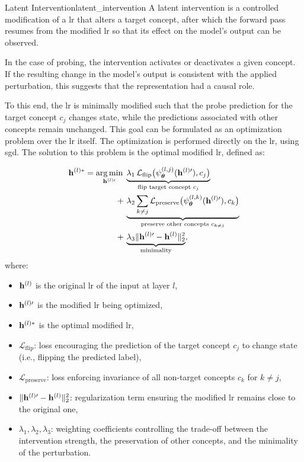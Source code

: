 \begin{definition}{Latent Intervention}{latent_intervention}
A latent intervention is a controlled modification of a \gls{lr} that alters a target concept, after which the forward pass resumes from the modified \gls{lr} so that its effect on the model's output can be observed.
\end{definition}

In the case of probing, the intervention activates or deactivates a given concept.
If the resulting change in the model's output is consistent with the applied perturbation, this suggests that the representation had a causal role.

To this end, the \gls{lr} is minimally modified such that the probe prediction for the target concept $c_j$ changes state, while the predictions associated with other concepts remain unchanged.
This goal can be formulated as an optimization problem over the \gls{lr} itself.
The optimization is performed directly on the \gls{lr}, using \gls{sgd}.
The solution to this problem is the optimal modified \gls{lr}, defined as:
\begin{equationwhere}
\[
\begin{aligned}
\latentRepresentation[l][*] =
\argmin_{\latentRepresentation[l][\prime]} \;
&\underbrace{\lambda_1 \, \mathcal{L}_{\mathrm{flip}}\big(\Probe{l}{j}(\latentRepresentation[l][\prime]), c_j\big)}_{\text{flip target concept } c_j} \\
+ \, &\underbrace{\lambda_2 \sum_{k \neq j} \mathcal{L}_{\mathrm{preserve}}\big(\Probe{l}{k}(\latentRepresentation[l][\prime]), c_k\big)}_{\text{preserve other concepts } c_{k \neq j}} \\
+ \, &\underbrace{\lambda_3 \|\latentRepresentation[l][\prime] - \latentRepresentation[l]\|_2^2}_{\text{minimality}},
\end{aligned}
\]
where:
\begin{itemize}
    \item $\latentRepresentation[l]$ is the original \gls{lr} of the input at layer $l$,
    \item $\latentRepresentation[l][\prime]$ is the modified \gls{lr} being optimized,
    \item $\latentRepresentation[l][*]$ is the optimal modified \gls{lr},
    \item $\mathcal{L}_{\mathrm{flip}}$: loss encouraging the prediction of the target concept $c_j$ to change state (i.e., flipping the predicted label),
    \item $\mathcal{L}_{\mathrm{preserve}}$: loss enforcing invariance of all non-target concepts $c_k$ for $k \neq j$,
    \item $\|\latentRepresentation[l][\prime] - \latentRepresentation[l]\|_2^2$: regularization term ensuring the modified \gls{lr} remains close to the original one,
    \item $\lambda_1, \lambda_2, \lambda_3$: weighting coefficients controlling the trade-off between the intervention strength, the preservation of other concepts, and the minimality of the perturbation.
\end{itemize}
\end{equationwhere}

